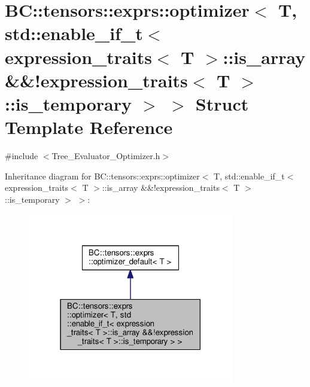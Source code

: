 \hypertarget{structBC_1_1tensors_1_1exprs_1_1optimizer_3_01T_00_01std_1_1enable__if__t_3_01expression__traitsf1cfe5fcb8a0bc73842726d99ded0fc2}{}\section{BC\+:\+:tensors\+:\+:exprs\+:\+:optimizer$<$ T, std\+:\+:enable\+\_\+if\+\_\+t$<$ expression\+\_\+traits$<$ T $>$\+:\+:is\+\_\+array \&\&!expression\+\_\+traits$<$ T $>$\+:\+:is\+\_\+temporary $>$ $>$ Struct Template Reference}
\label{structBC_1_1tensors_1_1exprs_1_1optimizer_3_01T_00_01std_1_1enable__if__t_3_01expression__traitsf1cfe5fcb8a0bc73842726d99ded0fc2}


{\ttfamily \#include $<$Tree\+\_\+\+Evaluator\+\_\+\+Optimizer.\+h$>$}



Inheritance diagram for BC\+:\+:tensors\+:\+:exprs\+:\+:optimizer$<$ T, std\+:\+:enable\+\_\+if\+\_\+t$<$ expression\+\_\+traits$<$ T $>$\+:\+:is\+\_\+array \&\&!expression\+\_\+traits$<$ T $>$\+:\+:is\+\_\+temporary $>$ $>$\+:
\nopagebreak
\begin{figure}[H]
\begin{center}
\leavevmode
\includegraphics[width=255pt]{structBC_1_1tensors_1_1exprs_1_1optimizer_3_01T_00_01std_1_1enable__if__t_3_01expression__traits55cecd79a96f749a8330dbb48f48db0f}
\end{center}
\end{figure}


